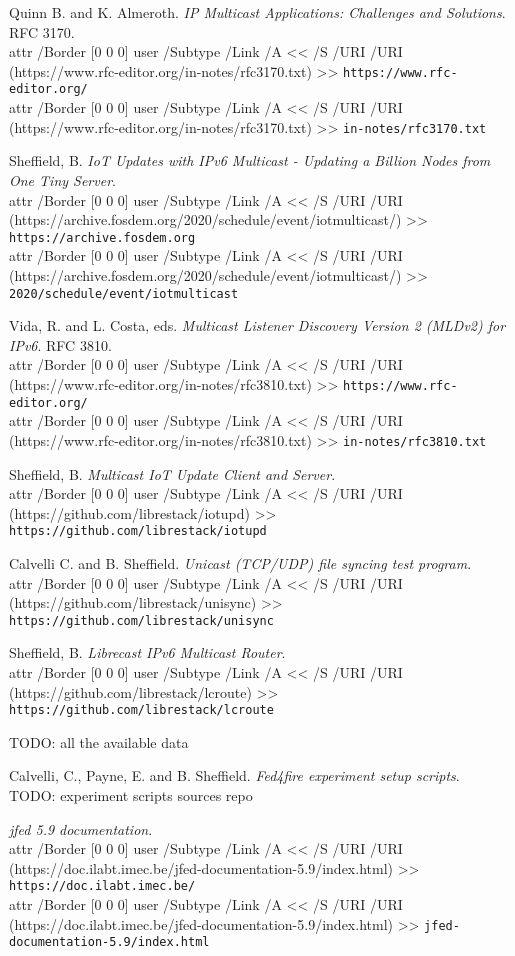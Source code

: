 \documentclass[a4paper,11pt,twocolumn]{article}
\newcommand{\longurl}[2]{%
\pdfstartlink %
attr {/Border [0 0 0]} %
user {/Subtype /Link /A << /S /URI /URI (#1) >>}%
{\footnotesize\tt #2}\pdfendlink}
\newcommand{\url}[1]{\longurl{#1}{#1}}
\newcommand{\url}[1]{{\footnotesize\tt #1}}
\newcommand{\longurl}[2]{{\footnotesize\tt #1}}
\begin{document}

\begin{thebibliography}{99}
\sloppy
{}

  Quinn B. and K. Almeroth.
  {\em IP Multicast Applications: Challenges and Solutions}.
  RFC 3170.\\
  \longurl{https://www.rfc-editor.org/in-notes/rfc3170.txt}%
  {https://www.rfc-editor.org/}\\
  \longurl{https://www.rfc-editor.org/in-notes/rfc3170.txt}%
  {in-notes/rfc3170.txt}

  Sheffield, B.
  {\em IoT Updates with IPv6 Multicast -  Updating a Billion Nodes from One Tiny Server}.\\
    \longurl{https://archive.fosdem.org/2020/schedule/event/iotmulticast/}%
     {https://archive.fosdem.org}\\
    \longurl{https://archive.fosdem.org/2020/schedule/event/iotmulticast/}%
     {2020/schedule/event/iotmulticast}

  Vida, R. and L. Costa, eds.
  {\em Multicast Listener Discovery Version 2 (MLDv2) for IPv6}.
  RFC 3810.\\
  \longurl{https://www.rfc-editor.org/in-notes/rfc3810.txt}%
  {https://www.rfc-editor.org/}\\
  \longurl{https://www.rfc-editor.org/in-notes/rfc3810.txt}%
  {in-notes/rfc3810.txt}

  Sheffield, B.
  {\em Multicast IoT Update Client and Server}.\\
  \url{https://github.com/librestack/iotupd}

  Calvelli C. and B. Sheffield.
  {\em Unicast (TCP/UDP) file syncing test program}.\\
  \url{https://github.com/librestack/unisync}

  Sheffield, B.
  {\em Librecast IPv6 Multicast Router}.\\
  \url{https://github.com/librestack/lcroute}

  TODO: all the available data

  Calvelli, C., Payne, E. and B. Sheffield.
  {\em Fed4fire experiment setup scripts}.\\
  TODO: experiment scripts sources repo

  {\em jfed 5.9 documentation}.\\
  \longurl{https://doc.ilabt.imec.be/jfed-documentation-5.9/index.html}%
  {https://doc.ilabt.imec.be/}\\
  \longurl{https://doc.ilabt.imec.be/jfed-documentation-5.9/index.html}%
  {jfed-documentation-5.9/index.html}


\end{thebibliography}
\end{document}
